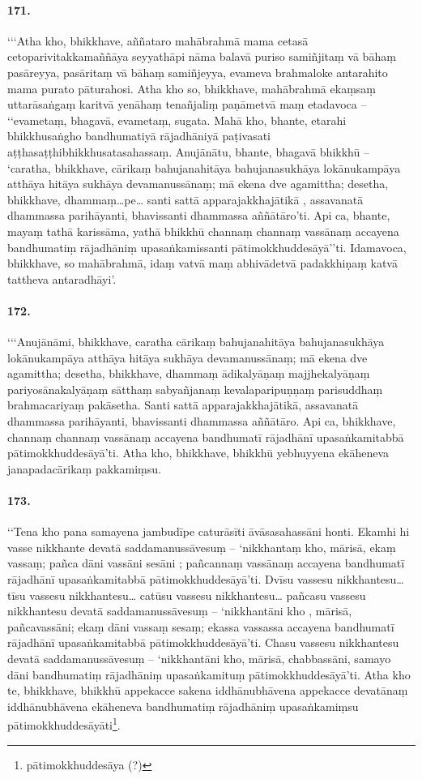 \paragraph{171.} ‘‘‘Atha kho, bhikkhave, aññataro mahābrahmā mama cetasā cetoparivitakkamaññāya seyyathāpi nāma balavā puriso samiñjitaṃ vā bāhaṃ pasāreyya, pasāritaṃ vā bāhaṃ samiñjeyya, evameva brahmaloke antarahito mama purato pāturahosi. Atha kho so, bhikkhave, mahābrahmā ekaṃsaṃ uttarāsaṅgaṃ karitvā yenāhaṃ tenañjaliṃ paṇāmetvā maṃ etadavoca – ‘‘evametaṃ, bhagavā, evametaṃ, sugata. Mahā kho, bhante, etarahi bhikkhusaṅgho bandhumatiyā rājadhāniyā paṭivasati aṭṭhasaṭṭhibhikkhusatasahassaṃ. Anujānātu, bhante, bhagavā bhikkhū – ‘caratha, bhikkhave, cārikaṃ bahujanahitāya bahujanasukhāya lokānukampāya atthāya hitāya sukhāya devamanussānaṃ; mā ekena dve agamittha; desetha, bhikkhave, dhammaṃ…pe… santi sattā apparajakkhajātikā , assavanatā dhammassa parihāyanti, bhavissanti dhammassa aññātāro’ti. Api ca, bhante, mayaṃ tathā karissāma, yathā bhikkhū channaṃ channaṃ vassānaṃ accayena bandhumatiṃ rājadhāniṃ upasaṅkamissanti pātimokkhuddesāyā’’ti. Idamavoca, bhikkhave, so mahābrahmā, idaṃ vatvā maṃ abhivādetvā padakkhiṇaṃ katvā tattheva antaradhāyi’.

\paragraph{172.} ‘‘‘Anujānāmi, bhikkhave, caratha cārikaṃ bahujanahitāya bahujanasukhāya lokānukampāya atthāya hitāya sukhāya devamanussānaṃ; mā ekena dve agamittha; desetha, bhikkhave, dhammaṃ ādikalyāṇaṃ majjhekalyāṇaṃ pariyosānakalyāṇaṃ sātthaṃ sabyañjanaṃ kevalaparipuṇṇaṃ parisuddhaṃ brahmacariyaṃ pakāsetha. Santi sattā apparajakkhajātikā, assavanatā dhammassa parihāyanti, bhavissanti dhammassa aññātāro. Api ca, bhikkhave, channaṃ channaṃ vassānaṃ accayena bandhumatī rājadhānī upasaṅkamitabbā pātimokkhuddesāyā’ti. Atha kho, bhikkhave, bhikkhū yebhuyyena ekāheneva janapadacārikaṃ pakkamiṃsu.

\paragraph{173.} ‘‘Tena kho pana samayena jambudīpe caturāsīti āvāsasahassāni honti. Ekamhi hi vasse nikkhante devatā saddamanussāvesuṃ – ‘nikkhantaṃ kho, mārisā, ekaṃ vassaṃ; pañca dāni vassāni sesāni ; pañcannaṃ vassānaṃ accayena bandhumatī rājadhānī upasaṅkamitabbā pātimokkhuddesāyā’ti. Dvīsu vassesu nikkhantesu… tīsu vassesu nikkhantesu… catūsu vassesu nikkhantesu… pañcasu vassesu nikkhantesu devatā saddamanussāvesuṃ – ‘nikkhantāni kho , mārisā, pañcavassāni; ekaṃ dāni vassaṃ sesaṃ; ekassa vassassa accayena bandhumatī rājadhānī upasaṅkamitabbā pātimokkhuddesāyā’ti. Chasu vassesu nikkhantesu devatā saddamanussāvesuṃ – ‘nikkhantāni kho, mārisā, chabbassāni, samayo dāni bandhumatiṃ rājadhāniṃ upasaṅkamituṃ pātimokkhuddesāyā’ti. Atha kho te, bhikkhave, bhikkhū appekacce sakena iddhānubhāvena appekacce devatānaṃ iddhānubhāvena ekāheneva bandhumatiṃ rājadhāniṃ upasaṅkamiṃsu pātimokkhuddesāyāti\footnote{pātimokkhuddesāya (?)}.

